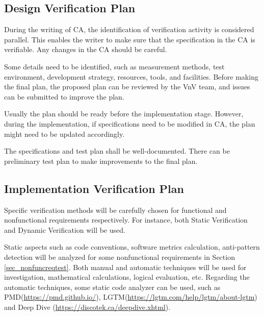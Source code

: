 \documentclass[12pt, titlepage]{article}
\begin{document}
\subsection{Design Verification Plan}

During the writing of CA, the identification of verification activity is
considered parallel. This enables the writer to make sure that the specification
in the CA is verifiable. Any changes in the CA should be careful. 

Some details need to be identified, such as measurement methods, test
environment, development strategy, resources, tools, and facilities. Before
making the final plan, the proposed plan can be reviewed by the VnV team, and
issues can be submitted to improve the plan.

Usually the plan should be ready before the implementation stage. However,
during the implementation, if specifications need to be modified in CA, the plan
might need to be updated accordingly.

The specifications and test plan shall be well-documented. There can be
preliminary test plan to make improvements to the final plan.


\subsection{Implementation Verification Plan}

Specific verification methods will be carefully chosen for functional and
nonfunctional requirements respectively. For instance, both Static Verification
and Dynamic Verification will be used.
    
    Static aspects such as code conventions, software metrics calculation,
anti-pattern detection will be analyzed for some nonfunctional requirements in
Section \ref{sec_nonfuncreqtest}. Both manual and automatic techniques will be
used for investigation, mathematical calculations, logical evaluation,
etc. Regarding the automatic techniques, some static code analyzer can be used,
such as PMD(\url{https://pmd.github.io/}), 
LGTM(\url{https://lgtm.com/help/lgtm/about-lgtm}) and Deep Dive
(\url{https://discotek.ca/deepdive.xhtml}).
    
\end{document}
